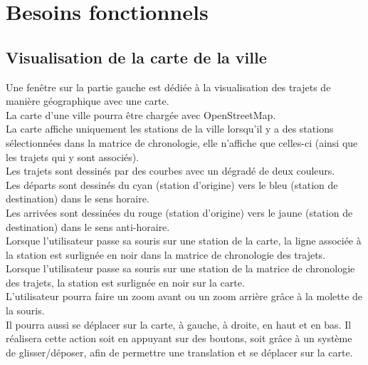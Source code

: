\documentclass[12pt]{article}
\begin{document}
	\newpage
	\section{Besoins fonctionnels}
		\subsection{Visualisation de la carte de la ville}
		Une fenêtre sur la partie gauche est dédiée à la visualisation des trajets de
		manière géographique avec une carte.\\
		La carte d’une ville pourra être chargée avec OpenStreetMap.\\
		La carte affiche uniquement les stations de la ville lorsqu’il y a des stations
		sélectionnées dans la matrice de chronologie, elle n’affiche que celles-ci (ainsi
		que les trajets qui y sont associés).\\
		Les trajets sont dessinés par des courbes avec un dégradé de deux couleurs.\\
		Les départs sont dessinés du cyan (station d’origine) vers le bleu (station de
		destination) dans le sens horaire.\\
		Les arrivées sont dessinées du rouge (station d’origine) vers le jaune
		(station de destination) dans le sens anti-horaire.\\
		Lorsque l’utilisateur passe sa souris sur une station de la carte, la ligne associée
		à la station est surlignée en noir dans la matrice de chronologie des trajets.\\
		Lorsque l’utilisateur passe sa souris sur une station de la matrice de chronologie
		des trajets, la station est surlignée en noir sur la carte.\\
		L’utilisateur pourra faire un zoom avant ou un zoom arrière grâce à la molette de la
		souris.\\
		Il pourra aussi se déplacer sur la carte, à gauche, à droite, en haut et en bas. Il
		réalisera cette action soit en appuyant sur des boutons, soit grâce à un système
		de glisser/déposer, afin de permettre une translation et se déplacer sur la carte.\\
		
\end{document}
